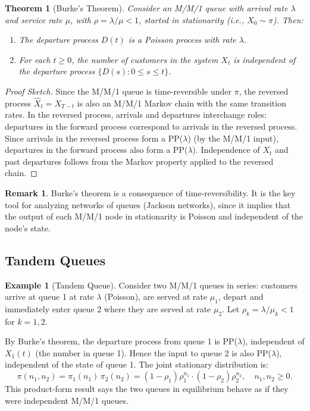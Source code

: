 \documentclass[12pt, a4paper]{article}
\theoremstyle{definition}
\newtheorem{example}{Example}[section]
\newtheorem{remark}{Remark}[section]
\theoremstyle{plain}
\newtheorem{theorem}{Theorem}[section]
\begin{document}
\begin{theorem}[Burke's Theorem]
Consider an M/M/1 queue with arrival rate $\lambda$ and service rate $\mu$, with $\rho = \lambda/\mu < 1$, started in stationarity (i.e., $X_0 \sim \pi$). Then:
\begin{enumerate}[label=(\roman*)]
  \item The departure process $D(t)$ is a Poisson process with rate $\lambda$.
  \item For each $t \ge 0$, the number of customers in the system $X_t$ is independent of the departure process $\{D(s) : 0 \le s \le t\}$.
\end{enumerate}
\end{theorem}

\begin{proof}[Proof Sketch]
Since the M/M/1 queue is time-reversible under $\pi$, the reversed process $\hat{X}_t = X_{T-t}$ is also an M/M/1 Markov chain with the same transition rates. In the reversed process, arrivals and departures interchange roles: departures in the forward process correspond to arrivals in the reversed process. Since arrivals in the reversed process form a PP($\lambda$) (by the M/M/1 input), departures in the forward process also form a PP($\lambda$). Independence of $X_t$ and past departures follows from the Markov property applied to the reversed chain.
\end{proof}

\begin{remark}
Burke's theorem is a consequence of time-reversibility. It is the key tool for analyzing networks of queues (Jackson networks), since it implies that the output of each M/M/1 node in stationarity is Poisson and independent of the node's state.
\end{remark}

\subsection{Tandem Queues}

\begin{example}[Tandem Queue]
Consider two M/M/1 queues in series: customers arrive at queue 1 at rate $\lambda$ (Poisson), are served at rate $\mu_1$, depart and immediately enter queue 2 where they are served at rate $\mu_2$. Let $\rho_k = \lambda/\mu_k < 1$ for $k=1,2$.

By Burke's theorem, the departure process from queue 1 is PP($\lambda$), independent of $X_1(t)$ (the number in queue 1). Hence the input to queue 2 is also PP($\lambda$), independent of the state of queue 1. The joint stationary distribution is:
\[
  \pi(n_1, n_2) = \pi_1(n_1)\,\pi_2(n_2)
    = (1-\rho_1)\rho_1^{n_1} \cdot (1-\rho_2)\rho_2^{n_2}, \quad n_1, n_2 \ge 0.
\]
This product-form result says the two queues in equilibrium behave as if they were independent M/M/1 queues.
\end{example}
\end{document}
